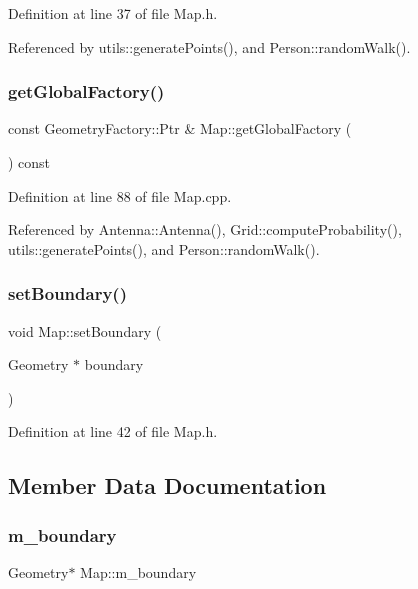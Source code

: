 Definition at line 37 of file Map.\+h.



Referenced by utils\+::generate\+Points(), and Person\+::random\+Walk().

\mbox{\label{class_map_a6385b465eea96277cde8dc10bf9af014}} 
\subsubsection{getGlobalFactory()}
{\footnotesize\ttfamily const Geometry\+Factory\+::\+Ptr \& Map\+::get\+Global\+Factory (\begin{DoxyParamCaption}{ }\end{DoxyParamCaption}) const}



Definition at line 88 of file Map.\+cpp.



Referenced by Antenna\+::\+Antenna(), Grid\+::compute\+Probability(), utils\+::generate\+Points(), and Person\+::random\+Walk().

\mbox{\label{class_map_acede2ccba9bf0f987f3dde8c332bec17}} 
\subsubsection{setBoundary()}
{\footnotesize\ttfamily void Map\+::set\+Boundary (\begin{DoxyParamCaption}\item[{Geometry $\ast$}]{boundary }\end{DoxyParamCaption})\hspace{0.3cm}{\ttfamily [inline]}}



Definition at line 42 of file Map.\+h.



\subsection{Member Data Documentation}
\mbox{\label{class_map_af2c95561cb4ff3b9950240351cf4303c}} 
\subsubsection{m\_boundary}
{\footnotesize\ttfamily Geometry$\ast$ Map\+::m\+\_\+boundary\hspace{0.3cm}{\ttfamily [private]}}



